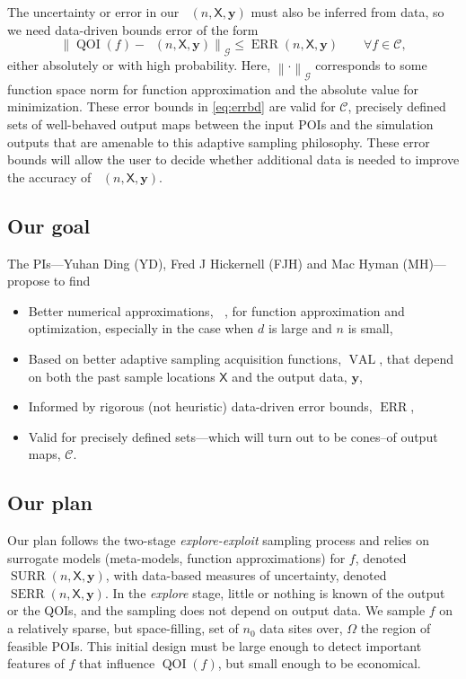 \documentclass[11pt]{NSFamsart}
\DeclareMathOperator{\QOI}{QOI}
\DeclareMathOperator{\APP}{\widehat{\QOI}}
\DeclareMathOperator{\SURR}{SURR}
\DeclareMathOperator{\ERR}{ERR}
\DeclareMathOperator{\VAL}{VAL}
\DeclareMathOperator{\SURRERR}{SERR}
\newcommand{\mX}{\mathsf{X}}
\newcommand{\by}{{\boldsymbol{y}}}
\newcommand{\calc}{{\mathcal{C}}}
\newcommand{\calg}{{\mathcal{G}}}
\newcommand{\norm}[2][{}]{\ensuremath{\left \lVert #2 \right \rVert}_{#1}}
\newcommand{\bignorm}[2][{}]{\ensuremath{\bigl \lVert #2 \bigr \rVert}_{#1}}
\begin{document}
The uncertainty or error in our $\APP(n,\mX,\by)$ must also be inferred from data, so we need data-driven bounds error of the form 
\begin{equation} \label{eq:errbd}
    \bignorm[\calg]{\QOI(f) - \APP(n,\mX,\by)} \le \ERR(n,\mX,\by) \qquad \forall f \in \calc,
\end{equation}
either absolutely or with high probability.  Here, $\norm[\calg]{\cdot}$ corresponds to some function space norm for function approximation and the absolute value for minimization.  These error bounds in \eqref{eq:errbd} are valid for $\calc$,  precisely defined sets of well-behaved output maps between the input POIs and the simulation outputs that are amenable to this adaptive sampling philosophy.  These error bounds will allow the user to decide whether additional data is needed to improve the accuracy of $\APP(n,\mX,\by)$.


\subsection{Our goal}

The PIs---Yuhan Ding (YD), Fred J Hickernell (FJH) and Mac Hyman (MH)---propose to find
\begin{itemize}
    \item Better numerical approximations, $\APP$, for function approximation and optimization, especially in the case when $d$ is large and $n$ is small,
    \item Based on better adaptive sampling acquisition functions, $\VAL$, that depend on both the past sample locations $\mX$ and the output data, $\by$, 
    \item Informed by rigorous (not heuristic) data-driven error bounds, $\ERR$, 
    \item Valid for precisely defined sets---which will turn out to be cones--of output maps, $\calc$.
\end{itemize}

\subsection{Our plan} \label{sec:OurPlan}

Our plan follows the two-stage \emph{explore-exploit} sampling process and relies on surrogate models (meta-models, function approximations) for $f$, denoted $\SURR(n,\mX,\by)$, with data-based measures of uncertainty, denoted $\SURRERR(n,\mX,\by)$.  In the \emph{explore} stage, little or nothing is known of the output or the QOIs, and the sampling does not depend on output data.  We sample $f$ on a relatively sparse, but space-filling, set of $n_0$ data sites over, $\Omega$ the region of feasible POIs.  This initial design must be large enough to detect important features of $f$ that influence $\QOI(f)$, but small enough to be economical. 
\end{document}
